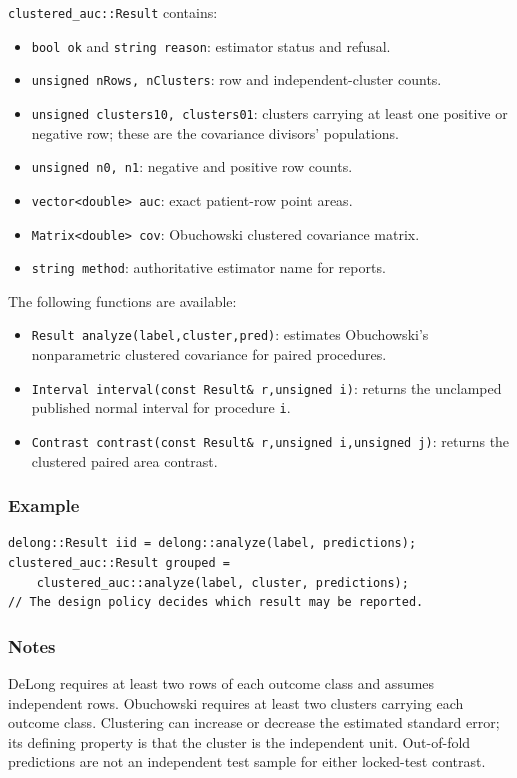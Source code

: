 \texttt{clustered\_auc::Result} contains:

\begin{itemize}
\item \texttt{bool ok} and \texttt{string reason}: estimator status and refusal.
\item \texttt{unsigned nRows, nClusters}: row and independent-cluster counts.
\item \texttt{unsigned clusters10, clusters01}: clusters carrying at least one
      positive or negative row; these are the covariance divisors' populations.
\item \texttt{unsigned n0, n1}: negative and positive row counts.
\item \texttt{vector<double> auc}: exact patient-row point areas.
\item \texttt{Matrix<double> cov}: Obuchowski clustered covariance matrix.
\item \texttt{string method}: authoritative estimator name for reports.
\end{itemize}

The following functions are available:

\begin{itemize}
\item \texttt{Result analyze(label,cluster,pred)}: estimates Obuchowski's
      nonparametric clustered covariance for paired procedures.
\item \texttt{Interval interval(const Result\& r,unsigned i)}: returns the
      unclamped published normal interval for procedure \texttt{i}.
\item \texttt{Contrast contrast(const Result\& r,unsigned i,unsigned j)}:
      returns the clustered paired area contrast.
\end{itemize}

\subsubsection{Example}
\begin{verbatim}
delong::Result iid = delong::analyze(label, predictions);
clustered_auc::Result grouped =
    clustered_auc::analyze(label, cluster, predictions);
// The design policy decides which result may be reported.
\end{verbatim}

\subsubsection{Notes}
DeLong requires at least two rows of each outcome class and assumes independent
rows.  Obuchowski requires at least two clusters carrying each outcome class.
Clustering can increase or decrease the estimated standard error; its defining
property is that the cluster is the independent unit.  Out-of-fold predictions
are not an independent test sample for either locked-test contrast.

